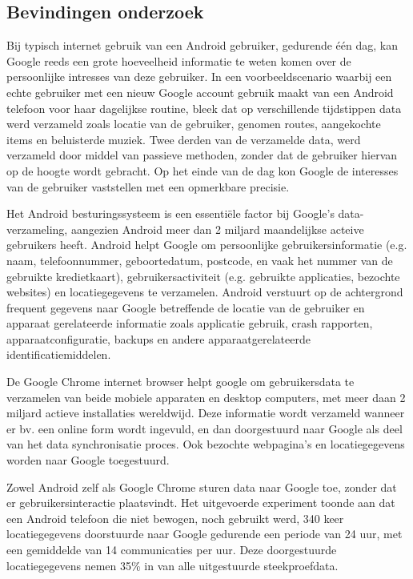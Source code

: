 \subsection{Bevindingen onderzoek}

Bij typisch internet gebruik van een Android gebruiker, gedurende één dag, kan Google reeds een grote hoeveelheid informatie te weten komen over de persoonlijke intresses van deze gebruiker. In een voorbeeldscenario waarbij een echte gebruiker met een nieuw Google account gebruik maakt van een Android telefoon voor haar dagelijkse routine, bleek dat op verschillende tijdstippen data werd verzameld zoals locatie van de gebruiker, genomen routes, aangekochte items en beluisterde muziek. Twee derden van de verzamelde data, werd verzameld door middel van passieve methoden, zonder dat de gebruiker hiervan op de hoogte wordt gebracht. Op het einde van de dag kon Google de interesses van de gebruiker vaststellen met een opmerkbare precisie.

Het Android besturingssysteem is een essentiële factor bij Google's data-verzameling, aangezien Android meer dan 2 miljard maandelijkse acteive gebruikers heeft. Android helpt Google om persoonlijke gebruikersinformatie (e.g. naam, telefoonnummer, geboortedatum, postcode, en vaak het nummer van de gebruikte kredietkaart), gebruikersactiviteit (e.g. gebruikte applicaties, bezochte websites) en locatiegegevens te verzamelen. Android verstuurt op de achtergrond frequent gegevens naar Google betreffende de locatie van de gebruiker en apparaat gerelateerde informatie zoals applicatie gebruik, crash rapporten, apparaatconfiguratie, backups en andere apparaatgerelateerde identificatiemiddelen.

De Google Chrome internet browser helpt google om gebruikersdata te verzamelen van beide mobiele apparaten en desktop computers, met meer daan 2 miljard actieve installaties wereldwijd. Deze informatie wordt verzameld wanneer er bv. een online form wordt ingevuld, en dan doorgestuurd naar Google als deel van het data synchronisatie proces. Ook bezochte webpagina's en locatiegegevens worden naar Google toegestuurd.

Zowel Android zelf als Google Chrome sturen data naar Google toe, zonder dat er gebruikersinteractie plaatsvindt. Het uitgevoerde experiment toonde aan dat een Android telefoon die niet bewogen, noch gebruikt werd, 340 keer locatiegegevens doorstuurde naar Google gedurende een periode van 24 uur, met een gemiddelde van 14 communicaties per uur. Deze doorgestuurde locatiegegevens nemen 35\% in van alle uitgestuurde steekproefdata.

